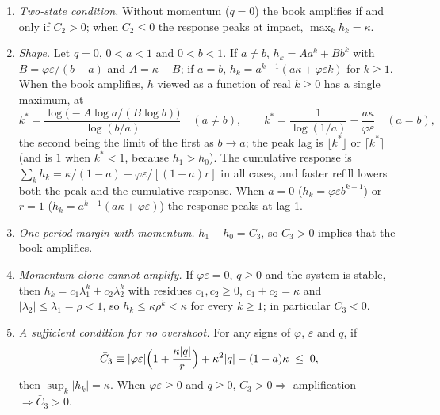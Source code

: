 \begin{theorem}\label{p2:thm:peak}
\begin{enumerate}[label=(\roman*)]
\item\label{p2:thm:t6} \emph{Two-state condition.} Without momentum ($q=0$) the book amplifies if and only if $C_2>0$; when $C_2\le0$ the response peaks at impact, $\max_kh_k=\kappa$.
\item\label{p2:prop:shape} \emph{Shape.} Let $q=0$, $0<a<1$ and $0<b<1$. If $a\neq b$, $h_k=Aa^k+Bb^k$ with $B=\varphi\varepsilon/(b-a)$ and $A=\kappa-B$; if $a=b$, $h_k=a^{k-1}(a\kappa+\varphi\varepsilon k)$ for $k\ge1$. When the book amplifies, $h$ viewed as a function of real $k\ge0$ has a single maximum, at
\[
k^*=\frac{\log\bigl(-A\log a/(B\log b)\bigr)}{\log(b/a)}\quad(a\neq b),\qquad k^*=\frac1{\log(1/a)}-\frac{a\kappa}{\varphi\varepsilon}\quad(a=b),
\]
the second being the limit of the first as $b\to a$; the peak lag is $\lfloor k^*\rfloor$ or $\lceil k^*\rceil$ (and is $1$ when $k^*<1$, because $h_1>h_0$). The cumulative response is $\sum_kh_k=\kappa/(1-a)+\varphi\varepsilon/[(1-a)r]$ in all cases, and faster refill lowers both the peak and the cumulative response. When $a=0$ ($h_k=\varphi\varepsilon b^{k-1}$) or $r=1$ ($h_k=a^{k-1}(a\kappa+\varphi\varepsilon)$) the response peaks at lag 1.
\item\label{p2:prop:t6m} \emph{One-period margin with momentum.} $h_1-h_0=C_3$, so $C_3>0$ implies that the book amplifies.
\item\label{p2:thm:nomom} \emph{Momentum alone cannot amplify.} If $\varphi\varepsilon=0$, $q\ge0$ and the system is stable, then $h_k=c_1\lambda_1^k+c_2\lambda_2^k$ with residues $c_1,c_2\ge0$, $c_1+c_2=\kappa$ and $|\lambda_2|\le\lambda_1=\rho<1$, so $h_k\le\kappa\rho^k<\kappa$ for every $k\ge1$; in particular $C_3<0$.
\item\label{p2:thm:noover} \emph{A sufficient condition for no overshoot.} For any signs of $\varphi$, $\varepsilon$ and $q$, if
\[
\bar C_3\equiv|\varphi\varepsilon|\Bigl(1+\frac{\kappa|q|}{r}\Bigr)+\kappa^2|q|-(1-a)\kappa\;\le\;0,
\]
then $\sup_k|h_k|=\kappa$. When $\varphi\varepsilon\ge0$ and $q\ge0$, $C_3>0\Rightarrow$ amplification $\Rightarrow\bar C_3>0$.
\end{enumerate}
\end{theorem}

